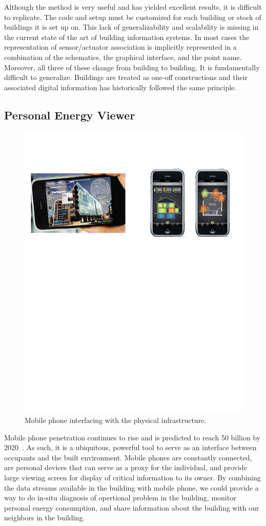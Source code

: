 Although the method is very useful and has yielded excellent results, it is difficult to replicate.  The code and setup must be 
customized for each building or stock of buildings it is set up on.  This lack of generalizability and scalability is missing
in the current state of the art of building information systems.  In most cases the representation of sensor/actuator association is 
implicitly represented in a combination of the schematics, the graphical interface, and the point name.  Moreover, all
three of these change from building to building.  It is fundamentally difficult to generalize.  Buildings are treated as one-off constructions
and their associated digital information has historically followed the same principle.


\subsection{Personal Energy Viewer}
\label{sec:mobile}

\begin{figure}[h!] %
\centering
\includegraphics[width=0.75\columnwidth]{figs/mobileEnergy1}
\caption{Mobile phone interfacing with the physical infrastructure.}
\label{fig:mobileEnergy1}
\end{figure}

Mobile phone penetration continues to rise and is predicted to reach 50 billion by 2020~\cite{mobile2020}.  As such, it is a ubiquitous,
powerful tool to serve as an interface between occupants and the built environment.  Mobile phones are constantly connected, 
are personal devices that can serve as a proxy for the individual, and provide large viewing screen for display of critical information
to its owner.  By combining the data streams available in the building with mobile phone, we could provide a way to
do in-situ diagnosis of opertional problem in the building, monitor personal energy consumption, and share information about
the building with our neighbors in the building.

